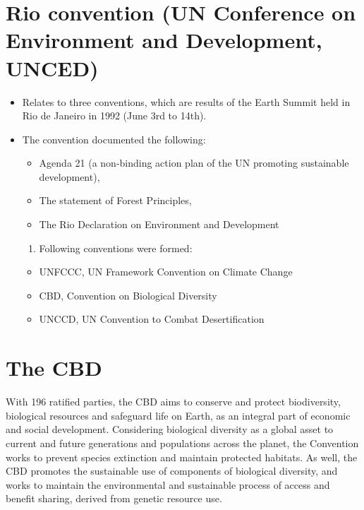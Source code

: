 \documentclass[
  openany]{book}
\providecommand{\tightlist}{%
  \setlength{\itemsep}{0pt}\setlength{\parskip}{0pt}}
\begin{document}
\hypertarget{rio-convention-un-conference-on-environment-and-development-unced}{%
\section{Rio convention (UN Conference on Environment and Development, UNCED)}\label{rio-convention-un-conference-on-environment-and-development-unced}}

\begin{itemize}
\tightlist
\item
  Relates to three conventions, which are results of the Earth Summit held in Rio de Janeiro in 1992 (June 3rd to 14th).
\item
  The convention documented the following:

  \begin{itemize}
  \tightlist
  \item
    Agenda 21 (a non-binding action plan of the UN promoting sustainable development),
  \item
    The statement of Forest Principles,
  \item
    The Rio Declaration on Environment and Development
  \end{itemize}

  \begin{enumerate}
  \def\labelenumi{\arabic{enumi}.}
  \setcounter{enumi}{61}
  \tightlist
  \item
    Following conventions were formed:
  \end{enumerate}

  \begin{itemize}
  \tightlist
  \item
    UNFCCC, UN Framework Convention on Climate Change
  \item
    CBD, Convention on Biological Diversity
  \item
    UNCCD, UN Convention to Combat Desertification
  \end{itemize}
\end{itemize}

\hypertarget{the-cbd}{%
\section{The CBD}\label{the-cbd}}

With 196 ratified parties, the CBD aims to conserve and protect biodiversity, biological resources and safeguard life on Earth, as an integral part of economic and social development. Considering biological diversity as a global asset to current and future generations and populations across the planet, the Convention works to prevent species extinction and maintain protected habitats. As well, the CBD promotes the sustainable use of components of biological diversity, and works to maintain the environmental and sustainable process of access and benefit sharing, derived from genetic resource use.
\end{document}
